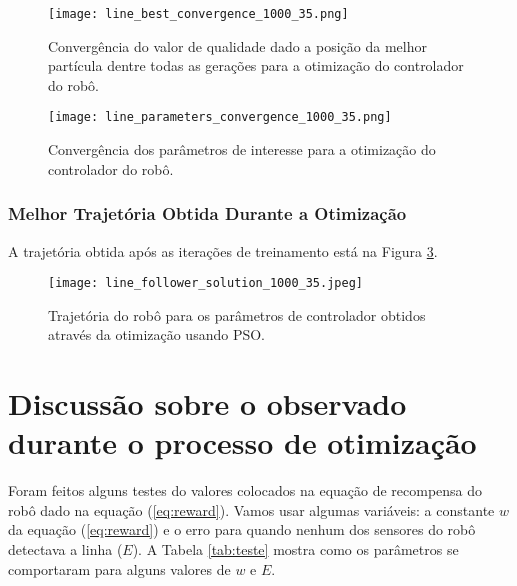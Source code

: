 \documentclass[brazil, 12pt]{article}
\begin{document}
\begin{figure}[H]
	\centering
	\texttt{[image: line\_best\_convergence\_1000\_35.png]} %
	\caption{Convergência do valor de qualidade dado a posição da melhor partícula dentre todas as gerações para a otimização do controlador do robô.} %
	\label{fig:line_best_convergence}  %
\end{figure}

\begin{figure}[H]
	\centering
	\texttt{[image: line\_parameters\_convergence\_1000\_35.png]} %
	\caption{Convergência dos parâmetros de interesse para a otimização do controlador do robô.} %
	\label{fig:line_parameters_convergence}  %
\end{figure}

\subsubsection{Melhor Trajetória Obtida Durante a Otimização}
A trajetória obtida após as iterações de treinamento está na Figura \ref{fig:line_follower_solution}.

\begin{figure}[H]
	\centering
	\texttt{[image: line\_follower\_solution\_1000\_35.jpeg]} %
	\caption{Trajetória do robô para os parâmetros de controlador obtidos através da otimização usando PSO.} %
	\label{fig:line_follower_solution}  %
\end{figure}

\section{Discussão sobre o observado durante o processo de otimização}
Foram feitos alguns testes do valores colocados na equação de recompensa do robô dado na equação (\ref{eq:reward}). Vamos usar algumas variáveis: a constante $w$ da equação (\ref{eq:reward}) e o erro para quando nenhum dos sensores do robô detectava a linha ($E$). A Tabela \ref{tab:teste} mostra como os parâmetros se comportaram para alguns valores de $w$ e $E$.
\end{document}
